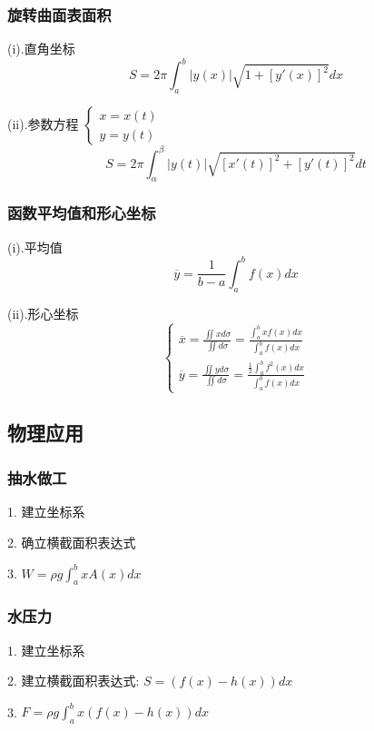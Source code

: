 \subsubsection{旋转曲面表面积}
\begin{theorem}[曲线旋转得到的曲面的表面积]

	(i).直角坐标
	$$S=2\pi\int_{a}^{b}|y(x)|\sqrt{1+[y'(x)]^{2}}dx$$

	(ii).参数方程 $\left\lbrace
		\begin{array}{l}
			x=x(t) \\
			y=y(t)
		\end{array}
		\right. $
	$$S=2\pi\int_{\alpha}^{\beta}|y(t)|\sqrt{[x'(t)]^{2}+[y'(t)]^{2}}dt$$
\end{theorem}
\subsubsection{函数平均值和形心坐标}
\begin{theorem}[平均值和形心坐标]

	(i).平均值
	$$\overline{y}=\frac{1}{b-a}\int_{a}^{b}f(x)dx$$

	(ii).形心坐标
	$$\left\lbrace
		\begin{array}{l}
			\overline{x}=\frac{\iint xd\sigma}{\iint d\sigma}=\frac{\int_{a}^{b}xf(x)dx}{\int_{a}^{b}f(x)dx} \\
			\overline{y}=\frac{\iint yd\sigma}{\iint d\sigma}=\frac{\frac{1}{2}\int_{a}^{b}f^{2}(x)dx}{\int_{a}^{b}f(x)dx}
		\end{array}
		\right. $$
\end{theorem}
\subsection{物理应用}
\subsubsection{抽水做工}
\begin{definition}[抽水做工]

	1. 建立坐标系

	2. 确立横截面积表达式

	3. $W=\rho g\int_{a}^{b}xA(x)dx$
\end{definition}
\subsubsection{水压力}
\begin{definition}[水中受到的压力]

	1. 建立坐标系

	2. 建立横截面积表达式:  $S=(f(x)-h(x))dx$

	3. $F=\rho g\int_{a}^{b}x(f(x)-h(x))dx$
\end{definition}


